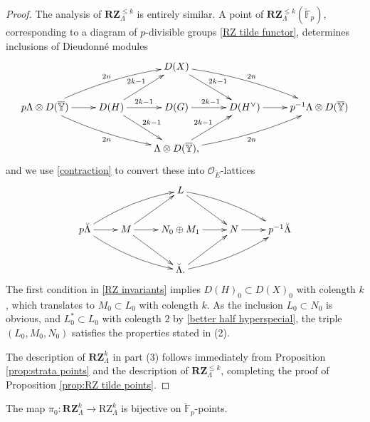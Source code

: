 \documentclass[11pt]{alggeom}
\newcommand{\F}{\mathbb F}
\newcommand{\co}{\mathcal O}
\begin{document}
\begin{proof}
The analysis of $\mathbf{RZ}^{\le k}_\Lambda$ is entirely similar.
A point  of $\mathbf{RZ}_\Lambda^{\le k}(\breve{\F}_p)$, corresponding to a diagram of $p$-divisible groups \eqref{RZ tilde functor},   determines inclusions of Dieudonn\'e modules 
\[
\xymatrix{
& &   {  D(X)  } \ar[dr]^{2k-1}  \ar@/^/[drr]^{2n} \\
{p\Lambda \otimes D(\overline{\mathbb{Y}})  }\ar[r]  \ar@/^/[urr]^{2n}   \ar@/_/[drr]_{2n}  &  { D(H) }  \ar[ur]^{2k-1} \ar[dr]^{2k-1}  \ar[r]^{ 2k -1 }  &  {D(G)}  \ar[r]^ { 2k-1} & {D( H^\vee) }  \ar[r]   & {p^{-1}\Lambda \otimes  D(\overline{\mathbb{Y}})  } \\
& &  { \Lambda \otimes  D(\overline{\mathbb{Y} }) , } \ar[ur]^{2k-1} \ar@/_/[urr]_{2n} 
}
\]
and we use \eqref{contraction}  to convert these  into $\co_{\breve{E}}$-lattices
\begin{equation}\label{fake minuscule lattices 2}
\xymatrix{
& &   {  L } \ar[dr]  \ar@/^/[drr] \\
{p \breve{\Lambda}   }\ar[r]  \ar@/^/[urr]   \ar@/_/[drr]  &  {M} \ar[ur] \ar[dr]   \ar[r] & { N_0 \oplus M_1 }  \ar[r] & { N }  \ar[r]  & {p^{-1}  \breve{\Lambda }  } \\
& &  {  \breve{\Lambda} .} \ar[ur] \ar@/_/[urr]
}
\end{equation}
The first condition in  \eqref{RZ invariants} implies $D(H)_0 \subset D(X)_0$ with colength $k$,  which translates to 
$M_0\subset L_0$ with colength $k$.  As the inclusion $L_0 \subset N_0$ is obvious, and $L_0^* \subset L_0$ with colength $2$ by \eqref{better half hyperspecial}, the triple $(L_0,M_0,N_0)$ satisfies the properties stated in (2).

The description of $\mathbf{RZ}^k_\Lambda$ in part (3) follows immediately from Proposition  \ref{prop:strata points} and the description of $\mathbf{RZ}^{\le k}_\Lambda$, completing the proof of Proposition \ref{prop:RZ tilde points}.
\end{proof}


\begin{corollary} \label{cor:augment bijection} 
The map $\pi_0 :  \mathbf{RZ}_\Lambda^k  \to  \mathrm{RZ}_\Lambda^k$ is bijective  on $\breve{\F}_p$-points.  
\end{corollary}
\end{document}
